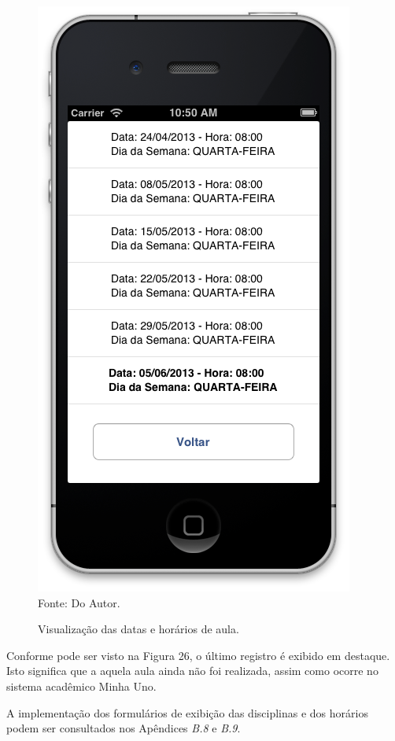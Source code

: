 \begin{figure}[!htb]
     \centering
     \caption[Formulário Horários do Semestre - Visualização dos Horários]{Visualização das datas e horários de aula.}
     \includegraphics[scale=0.34]{imagens/formconsultahorariosemestredisciplina.png}
     \\  Fonte: Do Autor.
\end{figure}
\newpage

Conforme pode ser visto na Figura 26, o último registro é exibido em destaque. Isto significa que a aquela aula ainda não foi realizada, assim como ocorre no sistema acadêmico Minha Uno.

A implementação dos formulários de exibição das disciplinas e dos horários podem ser consultados nos Apêndices \emph{B.8} e \emph{B.9}.

